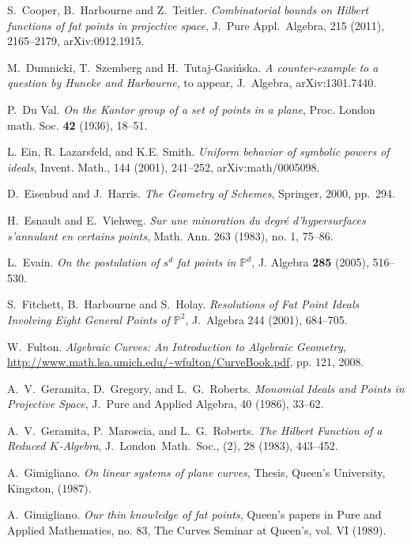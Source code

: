 \documentclass[11pt,twoside]{amsart}
\numberwithin{equation}{section}
\theoremstyle{definition}
\begin{document}
\begin{thebibliography}{B. et al}
 S.\ Cooper, B.\ Harbourne and Z.\ Teitler. 
\emph{Combinatorial bounds on Hilbert functions of fat points in projective space},
J.\ Pure Appl.\ Algebra, 215 (2011), 2165--2179, arXiv:0912.1915.

 M.\ Dumnicki, T.\ Szemberg and H.\ Tutaj-Gasi\'nska.
{\it A counter-example to a question by Huneke and Harbourne}, to appear, J.\ Algebra, 
arXiv:1301.7440.

 P.\ Du Val.
\emph{On the Kantor group of a set of points in a plane},
Proc. London math. Soc. {\bf 42} (1936), 18--51.

 L. Ein, R. Lazarsfeld, and K.E. Smith.
\emph{Uniform behavior of symbolic powers of ideals}, Invent. Math., 
144 (2001), 241--252, arXiv:math/0005098.

 D.\ Eisenbud and J.\ Harris.
\emph{The Geometry of Schemes},
Springer, 2000, pp.\ 294.
 
H.\ Esnault and E.\ Viehweg.
\emph{Sur une minoration du degr\'e d'hypersurfaces
s'annulant en certains points}, Math. Ann. 263 (1983), no. 1, 75--86.

 L.\ Evain.
\emph{On the postulation of $s^d$ fat points in ${\mathbb{P}^{d}}$},
J. Algebra {\bf 285} (2005), 516--530.

 S.\ Fitchett, B.\ Harbourne and S.\ Holay. 
\emph{Resolutions of Fat Point Ideals Involving Eight General Points of ${\mathbb{P}^{2}}$}, 
J.\ Algebra 244 (2001), 684--705. 

 W.\ Fulton.
\emph{Algebraic Curves: An Introduction to Algebraic Geometry},
\url{http://www.math.lsa.umich.edu/~wfulton/CurveBook.pdf}, pp. 121, 2008.

 A.\ V.\ Geramita, D.\ Gregory, and L.\ G.\ Roberts.
\emph{Monomial Ideals and Points in Projective Space},
J.\ Pure and Applied Algebra, 40 (1986), 33--62.

 A.\ V.\ Geramita, P.\ Maroscia, and L.\ G.\ Roberts.
\emph{The Hilbert Function of a Reduced $K$-Algebra},
J.\ London\ Math.\ Soc., (2), 28 (1983), 443--452.

 A.\ Gimigliano.
\emph{On linear systems of plane curves}, 
Thesis, Queen's University, Kingston, (1987).

 A.\ Gimigliano. 
\emph{Our thin knowledge of fat points}, 
Queen's papers in Pure and Applied Mathematics, no. 83, 
The Curves Seminar at Queen's, vol. VI (1989).


\end{thebibliography}
\end{document}
